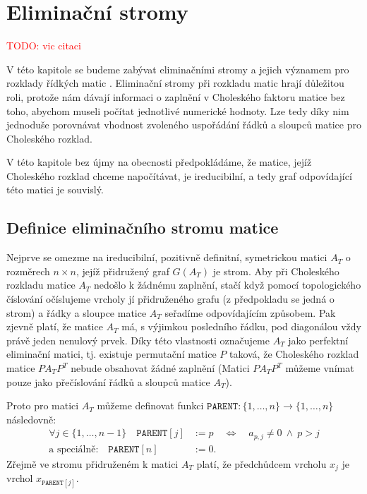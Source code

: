 \documentclass[11pt,american,czech,oneside]{book}
\theoremstyle{plain}
\theoremstyle{definition}
\newcommand{\TODO}[1]{\textcolor{red}{TODO: #1}}
\begin{document}
\section{Eliminační stromy}
\TODO{vic citaci}

V této kapitole se budeme zabývat eliminačními stromy a jejich významem pro rozklady řídkých matic \cite{liu:90}. Eliminační stromy při rozkladu matic hrají důležitou roli, protože nám dávají informaci o zaplnění v Choleského faktoru matice bez toho, abychom museli počítat jednotlivé numerické hodnoty. Lze tedy díky nim jednoduše porovnávat vhodnost zvoleného uspořádání řádků a sloupců matice pro Choleského rozklad.

V této kapitole bez újmy na obecnosti předpokládáme, že matice, jejíž Choleského rozklad chceme napočítávat, je ireducibilní, a tedy graf odpovídající této matici je souvislý.

\subsection{Definice eliminačního stromu matice}

Nejprve se omezme na ireducibilní, pozitivně definitní, symetrickou matici $A_T$ o rozměrech $n \times n$, jejíž přidružený graf $G(A_T)$ je strom. Aby při Choleského rozkladu matice $A_T$ nedošlo k žádnému zaplnění, stačí když pomocí topologického číslování očíslujeme vrcholy jí přidruženého grafu (z předpokladu se jedná o strom) a řádky a sloupce matice $A_T$ seřadíme odpovídajícím způsobem. Pak zjevně platí, že matice $A_T$ má, s výjimkou posledního řádku, pod diagonálou vždy právě jeden nenulový prvek. Díky této vlastnosti označujeme $A_T$ jako perfektní eliminační matici, tj. existuje permutační matice $P$ taková, že Choleského rozklad matice $PA_TP^T$ nebude obsahovat žádné zaplnění \cite{rose:72} (Matici $PA_TP^T$ můžeme vnímat pouze jako přečíslování řádků a sloupců matice $A_T$). 

Proto pro matici $A_T$ můžeme definovat funkci $\texttt{PARENT}:\{1,\ldots,n\} \rightarrow \{1,\ldots,n\}$ následovně:
\begin{align*}
  \forall j \in \{1,\ldots,n-1\} \quad \texttt{PARENT}[j] & := p \quad \Leftrightarrow \quad a_{p,j} \neq 0 \ \wedge \ p > j \\
  \text{a speciálně:} \quad \texttt{PARENT}[n] & := 0.
\end{align*}
Zřejmě ve stromu přidruženém k matici $A_T$ platí, že předchůdcem vrcholu $x_j$ je vrchol $x_{\texttt{PARENT}[j]}$.
\end{document}
